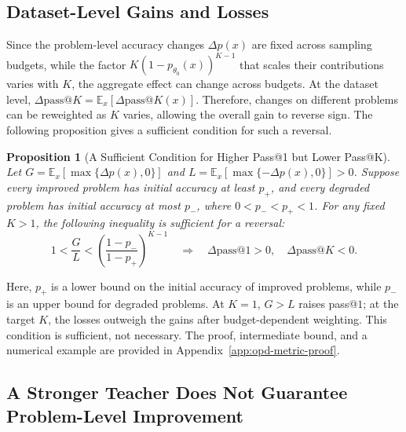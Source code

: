 \documentclass{article}
\theoremstyle{opdplain}
\newtheorem{proposition}{Proposition}
\begin{document}
\subsection{Dataset-Level Gains and Losses}
\label{sec:opd-metrics}


Since the problem-level accuracy changes $\Delta p(x)$ are fixed across sampling budgets, while the factor $K(1-p_{\theta_0}(x))^{K-1}$ that scales their contributions varies with $K$, the aggregate effect can change across budgets. At the dataset level, $\Delta\mathrm{pass}@K=\mathbb E_x[\Delta\mathrm{pass}@K(x)]$. Therefore, changes on different problems can be reweighted as $K$ varies, allowing the overall gain to reverse sign. The following proposition gives a sufficient condition for such a reversal.

\begin{proposition}[A Sufficient Condition for Higher Pass@1 but Lower Pass@K]
\label{prop:opd-budget-divergence}
Let $G=\mathbb E_x[\max\{\Delta p(x),0\}]$ and $L=\mathbb E_x[\max\{-\Delta p(x),0\}]>0$. Suppose every improved problem has initial accuracy at least $p_{+}$, and every degraded problem has initial accuracy at most $p_{-}$, where $0<p_{-}<p_{+}<1$. For any fixed $K>1$, the following inequality is sufficient for a reversal:
\begin{equation}
\label{eq:opd-budget-condition}
 1<\frac{G}{L}<\left(\frac{1-p_{-}}{1-p_{+}}\right)^{K-1}
 \quad\Longrightarrow\quad
 \Delta\mathrm{pass}@1>0,\quad\Delta\mathrm{pass}@K<0.
\end{equation}
\end{proposition}

Here, $p_{+}$ is a lower bound on the initial accuracy of improved problems, while $p_{-}$ is an upper bound for degraded problems. At $K=1$, $G>L$ raises pass@$1$; at the target $K$, the losses outweigh the gains after budget-dependent weighting. This condition is sufficient, not necessary. The proof, intermediate bound, and a numerical example are provided in Appendix~\ref{app:opd-metric-proof}.

\subsection{A Stronger Teacher Does Not Guarantee Problem-Level Improvement}
\label{sec:opd-learning-path}
\end{document}
